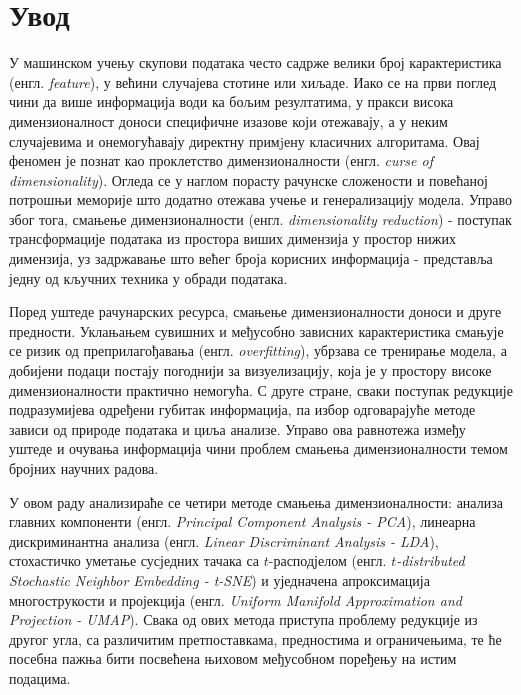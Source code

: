 \documentclass{article}
\newcommand\blankpage{
	\null
	\thispagestyle{empty}
	\addtocounter{page}{-1}
	\newpage}
\begin{document}
	
	\begin{titlepage}
		
	\end{titlepage}
	\vfill
	
	
	\tableofcontents
	\afterpage{\blankpage}
	\pagebreak
	
	
	\section{Увод}
	
	У машинском учењу скупови података често садрже велики број карактеристика (енгл. \textit{feature}), у већини случајева стотине или хиљаде. Иако се на први поглед чини да више информација води ка бољим резултатима, у пракси висока димензионалност доноси специфичне изазове који отежавају, а у неким случајевима и онемогућавају директну примjену класичних алгоритама. Овај феномен је познат као проклетство димензионалности (енгл. \textit{curse of dimensionality}). Огледа се у наглом порасту рачунске сложености и повећаној потрошњи меморије што додатно отежава учење и генерализацију модела. Управо због тога, смањење димензионалности (енгл. \textit{dimensionality reduction}) - поступак трансформације података из простора виших димензија у простор нижих димензија, уз задржавање што већег броја корисних информација - представља једну од кључних техника у обради података.
	
	Поред уштеде рачунарских ресурса, смањење димензионалности доноси и друге предности. Уклањањем сувишних и међусобно зависних карактеристика смањује се ризик од преприлагођавања (енгл. \textit{overfitting}), убрзава се тренирање модела, а добијени подаци постају погоднији за визуелизацију, која је у простору високе димензионалности практично немогућа. С друге стране, сваки поступак редукције подразумијева одређени губитак информација, па избор одговарајуће методе зависи од природе података и циља анализе. Управо ова равнотежа између уштеде и очувања информација чини проблем смањења димензионалности темом бројних научних радова.
	
	У овом раду анализираће се четири методе смањења димензионалности: анализа главних компоненти (енгл. \textit{Principal Component Analysis - PCA}), линеарна дискриминантна анализа (енгл. \textit{Linear Discriminant	Analysis - LDA}), стохастичко уметање сусједних тачака са $t$-расподјелом (енгл. \textit{$t$-distributed Stochastic Neighbor Embedding - t-SNE}) и уједначена апроксимација многострукости и пројекција (енгл. \textit{Uniform Manifold Approximation and Projection - UMAP}). Свака од ових метода приступа проблему редукције из другог угла, са различитим претпоставкама, предностима и ограничењима, те ће посебна пажња бити посвећена њиховом међусобном поређењу на истим подацима.
	
\end{document}

